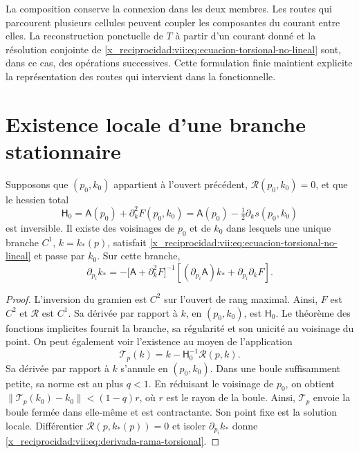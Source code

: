 La composition conserve la connexion dans les deux membres. Les routes
qui parcourent plusieurs cellules peuvent coupler les composantes du
courant entre elles. La reconstruction ponctuelle de \(T\) à partir
d'un courant donné et la résolution conjointe de
\eqref{x_reciprocidad:vii:eq:ecuacion-torsional-no-lineal} sont, dans ce cas,
des opérations successives. Cette formulation finie maintient explicite
la représentation des routes qui intervient dans la fonctionnelle.

\section{Existence locale d'une branche stationnaire}
\label{x_reciprocidad:vii:subsec:rama-torsional-local}

\begin{theorem}
\label{x_reciprocidad:vii:thm:rama-torsional-local}
Supposons que \((p_0,k_0)\) appartient à l'ouvert précédent,
\(\mathcal R(p_0,k_0)=0\), et que le hessien total
\begin{equation}
 \mathsf H_0
 =\mathsf A(p_0)+\partial_k^2F(p_0,k_0)
 =\mathsf A(p_0)-\tfrac12\partial_ks(p_0,k_0)
 \label{x_reciprocidad:vii:eq:hessiano-total-torsional}
\end{equation}
est inversible. Il existe des voisinages de \(p_0\) et de \(k_0\) dans lesquels
une unique branche \(C^1\), \(k=k_*(p)\), satisfait
\eqref{x_reciprocidad:vii:eq:ecuacion-torsional-no-lineal} et passe par \(k_0\).
Sur cette branche,
\begin{equation}
 \partial_{p_i}k_*
 =-\bigl[\mathsf A+\partial_k^2F\bigr]^{-1}
     \left[(\partial_{p_i}\mathsf A)k_*
                      +\partial_{p_i}\partial_kF\right].
 \label{x_reciprocidad:vii:eq:derivada-rama-torsional}
\end{equation}
\end{theorem}

\begin{proof}
L'inversion du gramien est \(C^2\) sur l'ouvert de rang maximal. Ainsi, \(F\) est \(C^2\) et \(\mathcal R\) est \(C^1\). Sa dérivée par rapport à \(k\), en \((p_0,k_0)\), est \(\mathsf H_0\). Le théorème des fonctions implicites fournit la branche, sa régularité et son unicité au voisinage du point. On peut également voir l'existence au moyen de l'application
\[
 \mathcal T_p(k)=k-\mathsf H_0^{-1}\mathcal R(p,k).
\]
Sa dérivée par rapport à \(k\) s'annule en \((p_0,k_0)\).
Dans une boule suffisamment petite, sa norme est au plus
\(q<1\). En réduisant le voisinage de \(p_0\), on obtient
\(\|\mathcal T_p(k_0)-k_0\|<(1-q)r\), où \(r\) est le
rayon de la boule. Ainsi, \(\mathcal T_p\) envoie la boule fermée
dans elle-même et est contractante. Son point fixe est la solution locale.
Différentier \(\mathcal R(p,k_*(p))=0\) et isoler
\(\partial_{p_i}k_*\) donne
\eqref{x_reciprocidad:vii:eq:derivada-rama-torsional}.
\end{proof}

